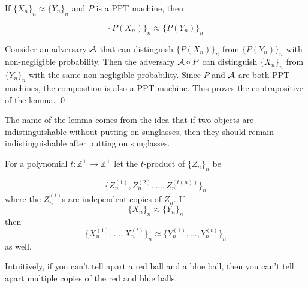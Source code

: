 \begin{lemma}
If $\{X_n\}_n\approx\{Y_n\}_n$ and $P$ is a PPT machine, then

$$\{P(X_n)\}_n\approx \{P(Y_n)\}_n$$
\end{lemma}

\proof
Consider an adversary $\mathcal{A}$ that can distinguish $\{P(X_n)\}_n$ from $\{P(Y_n)\}_n$ with non-negligible probability. Then the adversary $\mathcal{A}\circ P$ can distinguish $\{X_n\}_n$ from $\{Y_n\}_n$ with the same non-negligible probability. Since $P$ and $\mathcal{A}$ are both PPT machines, the composition is also a PPT machine. This proves the contrapositive of the lemma.
\qed

The name of the lemma comes from the idea that if two objects are indistinguishable without putting on sunglasses, then they should remain indistinguishable after putting on sunglasses.

\begin{lemma}
For a polynomial $t:\mathbb{Z}^+\rightarrow\mathbb{Z}^+$ let the $t$-product of $\{Z_n\}_n$ be

$$\{Z_n^{(1)}, Z_n^{(2)},\hdots, Z_n^{(t(n))}\}_n$$
where the $Z_n^{(i)}$s are independent copies of $Z_n$. If
$$\{X_n\}_n\approx\{Y_n\}_n$$
then
$$\{X_n^{(1)},\hdots,X_n^{(t)}\}_n\approx\{Y_n^{(1)},\hdots,Y_n^{(t)}\}_n$$
as well.
\end{lemma}
Intuitively, if you can't tell apart a red ball and a blue ball, then you can't tell apart multiple copies of the red and blue balls.

